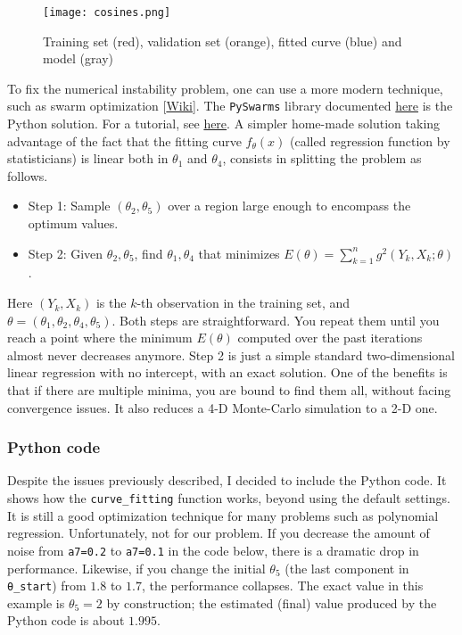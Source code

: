 \documentclass[oneside,10pt]{book}
\begin{document}
\begin{figure}[H]
\centering
\texttt{[image: cosines.png]}
\caption{Training set (red), validation set (orange), fitted curve (blue) and model (gray)}
\label{fig:pyplot1}
\end{figure}

To fix the numerical instability problem, one can use a more modern technique, such as \textcolor{index}{swarm optimization} [\href{https://en.wikipedia.org/wiki/Particle_swarm_optimization}{Wiki}]. The \texttt{PySwarms} library documented \href{https://pyswarms.readthedocs.io/en/latest/}{here}
 is the Python solution. For a tutorial, see
 \href{https://machinelearningmastery.com/a-gentle-introduction-to-particle-swarm-optimization/}{here}. A simpler home-made solution taking
advantage of the fact that the fitting curve $f_\theta(x)$ (called regression function by statisticians) is linear both in $\theta_1$ and
 $\theta_4$,  consists in splitting the problem as follows.

\begin{itemize}
\item Step 1: Sample $(\theta_2,\theta_5)$ over a region large enough to encompass the optimum values.
\item Step 2:  Given $\theta_2,\theta_5$, find $\theta_1,\theta_4$ that minimizes $E(\theta)=\sum_{k=1}^n g^2(Y_k,X_k;\theta)$.
\end{itemize}
Here $(Y_k,X_k)$ is the $k$-th observation in the training set, and $\theta=(\theta_1,\theta_2, \theta_4,\theta_5)$. Both steps are straightforward.
You repeat them until you reach a point where the minimum $E(\theta)$ computed over the past iterations almost never decreases anymore. Step 2 is just a simple standard two-dimensional linear regression with no intercept, with an exact solution. One of the benefits is that if there are
 multiple minima, you are bound to find them all, without facing convergence issues. It also reduces a 4-D Monte-Carlo simulation to a 2-D one.



\subsubsection{Python code}\label{poihgf}

Despite the issues previously described, I decided to include the Python code. It shows how the \texttt{curve\_fitting} function works, beyond using the default settings.
 It is still a good optimization technique for many problems such as polynomial regression. Unfortunately, not for our problem. If you decrease
 the amount of noise from \texttt{a7=0.2} to \texttt{a7=0.1} in the code below, there is a dramatic drop in performance. Likewise, if you change the  initial $\theta_5$ (the last component in  \texttt{\textcolor{gray2}{θ}\_start})
  from
$1.8$ to $1.7$, the performance collapses. The exact value in this example is $\theta_5=2$ by construction; the estimated
 (final) value produced by the Python code is about $1.995$.
\end{document}
